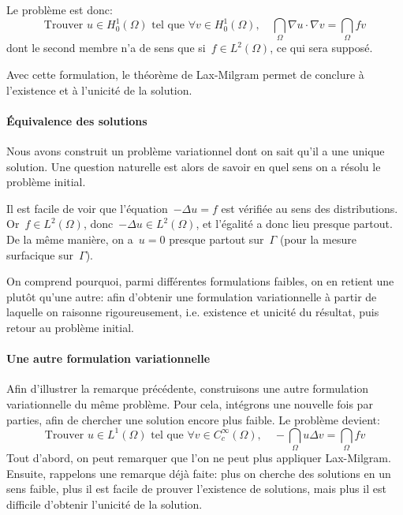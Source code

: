 Le problème est donc:
\begin{equation}
\text{Trouver } u \in H^1_0(\Omega) \text{ tel que }
\forall v\in H^1_0(\Omega),\quad
\dint_\Omega \nabla u\cdot\nabla v = \dint_\Omega fv
\end{equation}
dont le second membre n'a de sens que si~$f\in L^2(\Omega)$, ce qui
sera supposé.

Avec cette formulation, le théorème de Lax-Milgram permet de conclure
à l'existence et à l'unicité de la solution.

\medskip{}
\paragraph{Équivalence des solutions}
Nous avons construit un problème variationnel dont on sait qu'il a une
unique solution.
Une question naturelle est alors de savoir en quel sens on a résolu le problème initial.

Il est facile de voir que l'équation~$-\Delta u = f$ est vérifiée au sens des distributions.
Or~$f\in L^2(\Omega)$, donc~$-\Delta u \in L^2(\Omega)$, et l'égalité a donc lieu presque
partout.
De la même manière, on a~$u = 0$ presque partout sur~$\Gamma$ (pour la mesure
surfacique sur~$\Gamma$).

On comprend pourquoi, parmi différentes formulations faibles, on en retient une
plutôt qu'une autre: afin d'obtenir une formulation variationnelle à partir de laquelle
on raisonne rigoureusement, i.e. existence et unicité du résultat, puis retour au problème
initial.

\medskip{}
\paragraph{Une autre formulation variationnelle}
Afin d'illustrer la remarque précédente, construisons une autre formulation
variationnelle du même problème.
Pour cela, intégrons une nouvelle fois par parties, afin de chercher
une solution encore plus faible.
Le problème devient:
\begin{equation}
\text{Trouver } u \in L^1(\Omega) \text{ tel que }
\forall v\in C_c^\infty(\Omega),\quad
-\dint_\Omega u\Delta v = \dint_\Omega fv
\end{equation}
Tout d'abord, on peut remarquer que l'on ne peut plus appliquer Lax-Milgram.
Ensuite, rappelons une remarque déjà faite:
plus on cherche des solutions en un sens faible, plus il est facile de prouver l'existence
de solutions, mais plus il est difficile d'obtenir l'unicité de la solution.

